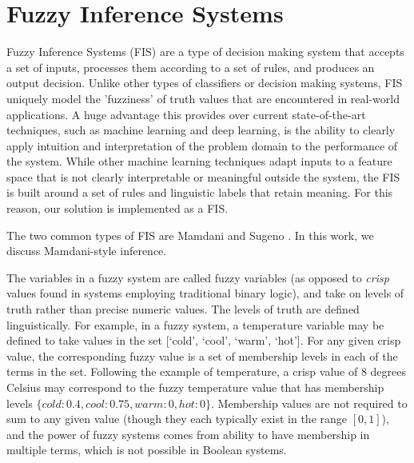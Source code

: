 \documentclass[12pt]{report}
\begin{document}
\section{Fuzzy Inference Systems}
Fuzzy Inference Systems (FIS) are a type of decision making system that accepts a set of inputs, processes them according to a set of rules, and produces an output decision. Unlike other types of classifiers or decision making systems, FIS uniquely model the 'fuzziness' of truth values that are encountered in real-world applications. A huge advantage this provides over current state-of-the-art techniques, such as machine learning and deep learning, is the ability to clearly apply intuition and interpretation of the problem domain to the performance of the system. While other machine learning techniques adapt inputs to a feature space that is not clearly interpretable or meaningful outside the system, the FIS is built around a set of rules and linguistic labels that retain meaning. For this reason, our solution is implemented as a FIS.

The two common types of FIS are Mamdani \cite{Mamdani1975AnController} and Sugeno \cite{Sugeno1985IndustrialControl}. In this work, we discuss Mamdani-style inference.

The variables in a fuzzy system are called fuzzy variables (as opposed to \emph{crisp} values found in systems employing traditional binary logic), and take on levels of truth rather than precise numeric values. The levels of truth are defined linguistically. For example, in a fuzzy system, a temperature variable may be defined to take values in the set [`cold', `cool', `warm', `hot']. For any given crisp value, the corresponding fuzzy value is a set of membership levels in each of the terms in the set. Following the example of temperature, a crisp value of 8 degrees Celsius may correspond to the fuzzy temperature value that has membership levels $\{cold: 0.4, cool: 0.75, warm: 0, hot: 0\}$. Membership values are not required to sum to any given value (though they each typically exist in the range $[0,1]$), and the power of fuzzy systems comes from ability to have membership in multiple terms, which is not possible in Boolean systems.
\end{document}
